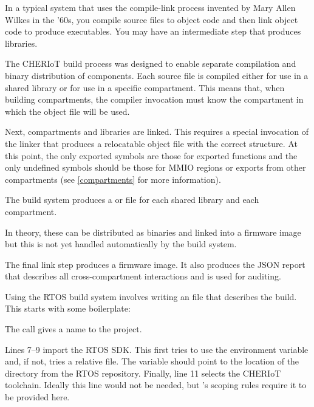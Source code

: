 In a typical system that uses the compile-link process invented by Mary Allen Wilkes in the '60s, you compile source files to object code and then link object code to produce executables.
You may have an intermediate step that produces libraries.

The CHERIoT build process was designed to enable separate compilation and binary distribution of components.
Each source file is compiled either for use in a shared library or for use in a specific compartment.
This means that, when building compartments, the compiler invocation must know the compartment in which the object file will be used.

Next, compartments and libraries are linked.
This requires a special invocation of the linker that produces a relocatable object file with the correct structure.
At this point, the only exported symbols are those for exported functions and the only undefined symbols should be those for MMIO regions or exports from other compartments (see \ref{compartments} for more information).

\begin{note}
	The build system produces a  or  file for each shared library and each compartment.
\end{note}
In theory, these can be distributed as binaries and linked into a firmware image but this is not yet handled automatically by the build system.

The final link step produces a firmware image.
It also produces the JSON report that describes all cross-compartment interactions and is used for auditing.

Using the RTOS build system involves writing an  file that describes the build.
This starts with some boilerplate:

\lualisting[filename=examples/hello_world/xmake.lua,marker=boilerplate,label=lst:xmakeboilerplate,caption="Build system code for importing the CHERIoT RTOS SDK"]{}

The  call gives a name to the project.

Lines 7–9 import the RTOS SDK.
This first tries to use the  environment variable and, if not, tries a relative file.
The  variable should point to the location of the  directory from the RTOS repository.
Finally, line 11 selects the CHERIoT toolchain.
Ideally this line would not be needed, but 's scoping rules require it to be provided here.

